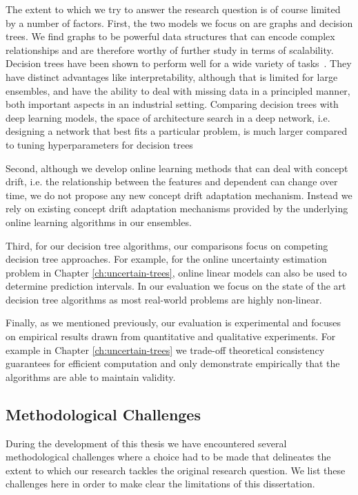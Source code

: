 The extent to which we try to answer the research question is of course limited by
a number of factors. First, the two models we focus on are graphs and decision
trees. We find graphs to be powerful data structures that can encode complex
relationships and are therefore worthy of further study in terms of scalability.
Decision trees have been shown to perform well for a wide variety of tasks~\cite{hundreds-classifiers}.
They have distinct advantages like interpretability, although that is limited
for large ensembles, and have the ability to deal with missing data in a principled
manner, both important aspects in an industrial setting.
Comparing decision trees with deep learning models, the space
of architecture search in a deep network, i.e. designing a network that best fits
a particular problem, is much larger compared to tuning hyperparameters for
decision trees

Second, although we develop online learning methods that can deal
with concept drift, i.e. the relationship between the features and dependent
can change over time, we do not propose any new concept drift adaptation
mechanism. Instead we rely on existing concept drift adaptation mechanisms
provided by the underlying online learning algorithms in our ensembles.

Third, for our decision tree algorithms, our comparisons focus on
competing decision tree approaches. For example, for the online uncertainty
estimation problem in Chapter \ref{ch:uncertain-trees}, online linear
models can also be used to determine prediction intervals. In our evaluation
we focus on the state of the art decision tree algorithms as
most real-world problems are highly non-linear.

Finally, as we mentioned previously, our evaluation is experimental
and focuses on empirical results drawn from quantitative and qualitative
experiments. For example in Chapter \ref{ch:uncertain-trees} we trade-off
theoretical consistency guarantees for efficient computation
and only demonstrate empirically that the algorithms are able to maintain validity.

\subsection{Methodological Challenges}

During the development of this thesis we have encountered several methodological
challenges where a choice had to be made that delineates the extent to which
our research tackles the original research question. We list these challenges
here in order to make clear the limitations of this dissertation.

